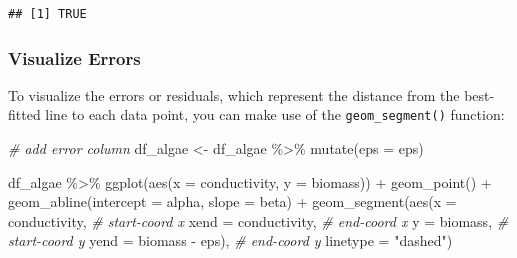 \documentclass[
]{article}
\newenvironment{Shaded}{\begin{snugshade}}{\end{snugshade}}
\newcommand{\AttributeTok}[1]{\textcolor[rgb]{0.77,0.63,0.00}{#1}}
\newcommand{\CommentTok}[1]{\textcolor[rgb]{0.56,0.35,0.01}{\textit{#1}}}
\newcommand{\FunctionTok}[1]{\textcolor[rgb]{0.00,0.00,0.00}{#1}}
\newcommand{\NormalTok}[1]{#1}
\newcommand{\OtherTok}[1]{\textcolor[rgb]{0.56,0.35,0.01}{#1}}
\newcommand{\SpecialCharTok}[1]{\textcolor[rgb]{0.00,0.00,0.00}{#1}}
\newcommand{\StringTok}[1]{\textcolor[rgb]{0.31,0.60,0.02}{#1}}
\begin{document}
\begin{verbatim}
## [1] TRUE
\end{verbatim}

\hypertarget{visualize-errors}{%
\subsubsection{Visualize Errors}\label{visualize-errors}}

To visualize the errors or residuals, which represent the distance from the best-fitted line to each data point, you can make use of the \texttt{geom\_segment()} function:

\begin{Shaded}
\begin{Highlighting}[]
\CommentTok{\# add error column}
\NormalTok{df\_algae }\OtherTok{\textless{}{-}}\NormalTok{ df\_algae }\SpecialCharTok{\%\textgreater{}\%} 
  \FunctionTok{mutate}\NormalTok{(}\AttributeTok{eps =}\NormalTok{ eps)}

\NormalTok{df\_algae }\SpecialCharTok{\%\textgreater{}\%} 
  \FunctionTok{ggplot}\NormalTok{(}\FunctionTok{aes}\NormalTok{(}\AttributeTok{x =}\NormalTok{ conductivity,}
             \AttributeTok{y =}\NormalTok{ biomass)) }\SpecialCharTok{+}
  \FunctionTok{geom\_point}\NormalTok{() }\SpecialCharTok{+}
  \FunctionTok{geom\_abline}\NormalTok{(}\AttributeTok{intercept =}\NormalTok{ alpha,}
              \AttributeTok{slope =}\NormalTok{ beta) }\SpecialCharTok{+} 
  \FunctionTok{geom\_segment}\NormalTok{(}\FunctionTok{aes}\NormalTok{(}\AttributeTok{x =}\NormalTok{ conductivity, }\CommentTok{\# start{-}coord x}
                   \AttributeTok{xend =}\NormalTok{ conductivity, }\CommentTok{\# end{-}coord x}
                   \AttributeTok{y =}\NormalTok{ biomass, }\CommentTok{\# start{-}coord y}
                   \AttributeTok{yend =}\NormalTok{ biomass }\SpecialCharTok{{-}}\NormalTok{ eps), }\CommentTok{\# end{-}coord y}
               \AttributeTok{linetype =} \StringTok{"dashed"}\NormalTok{)}
\end{Highlighting}
\end{Shaded}
\end{document}
